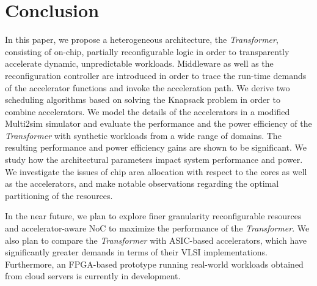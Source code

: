 \section{Conclusion}
\label{sec_concl}

In this paper, we propose a heterogeneous architecture, the {\em
  Transformer}, consisting of on-chip, partially reconfigurable logic in order to
transparently accelerate dynamic, unpredictable workloads.
Middleware as well as the reconfiguration controller are introduced in order to trace the
run-time demands of the accelerator functions and invoke the acceleration
path. We derive two scheduling algorithms based on solving the Knapsack
problem in order to combine accelerators. We model the details of the
accelerators in a modified Multi2sim simulator and evaluate the
performance and the power efficiency of the {\em Transformer} with synthetic
workloads from a wide range of domains. The resulting performance and power
efficiency gains are shown to be significant. We study how the 
architectural parameters impact system performance and power. We
investigate the issues of chip area allocation with respect to the cores as well as the accelerators, and make notable observations 
regarding the optimal partitioning of the resources. 

In the near future, we plan to explore finer granularity
reconfigurable resources and accelerator-aware NoC to maximize the
performance of the {\em Transformer}. We also plan to compare the {\em Transformer}
with ASIC-based accelerators, which have significantly greater demands in terms of their VLSI
implementations. Furthermore, an FPGA-based prototype running real-world workloads obtained from cloud
servers is currently in development.

